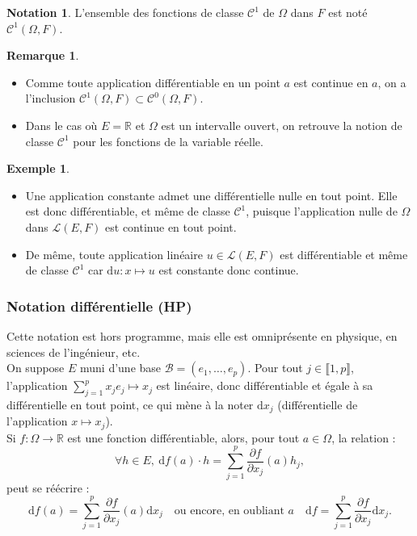 \documentclass[french]{article}
\newcommand{\R}{\mathbb{R}}
\renewcommand{\d}{\text{d}}
\theoremstyle{plain}
\theoremstyle{definition}
\newtheorem*{ex}{Exemple}
\newtheorem*{rmq}{Remarque}
\newtheorem*{notation}{Notation}
\theoremstyle{remark}
\begin{document}
\begin{notation}
	L'ensemble des fonctions de classe $\mathcal{C}^1$ de $\Omega$ dans $F$ est noté $\mathcal{C}^1(\Omega, F)$. 
\end{notation}

\begin{rmq}
	\begin{itemize}
		\item Comme toute application différentiable en un point $a$ est continue en $a$, on a l'inclusion $\mathcal{C}^1(\Omega,F)\subset\mathcal{C}^0(\Omega,F)$.
		\item Dans le cas où $E=\R$ et $\Omega$ est un intervalle ouvert, on retrouve la notion de classe $\mathcal{C}^1$ pour les fonctions de la variable réelle.
	\end{itemize}
\end{rmq}

\begin{ex}
	\begin{itemize}
		\item Une application constante admet une différentielle nulle en tout point. Elle est donc différentiable, et même de classe $\mathcal{C}^1$, puisque l'application nulle de $\Omega$ dans $\mathcal{L}(E,F)$ est continue en tout point.
		\item De même, toute application linéaire $u\in\mathcal{L}(E,F)$ est différentiable et même de classe $\mathcal{C}^1$ car $\d u:x\mapsto u$ est constante donc continue.
	\end{itemize}
\end{ex}

\subsubsection*{Notation différentielle (HP)}

Cette notation est hors programme, mais elle est omniprésente en physique, en sciences de l'ingénieur, etc.\\
On suppose $E$ muni d'une base $\mathcal{B}=(e_1,\ldots,e_p)$. Pour tout $j\in\llbracket1,p\rrbracket$, l'application $\displaystyle\sum_{j=1}^{p}x_je_j\mapsto x_j$ est linéaire, donc différentiable et égale à sa différentielle en tout point, ce qui mène à la noter $\d x_j$ (différentielle de l'application $x\mapsto x_j$).\\
Si $f:\Omega\to\R$ est une fonction différentiable, alors, pour tout $a\in\Omega$, la relation :
$$\forall h\in E,\ \d f(a)\cdot h=\sum_{j=1}^{p}\frac{\partial f}{\partial x_j}(a)h_j,$$ peut se réécrire :
$$\d f(a)=\sum_{j=1}^{p}\frac{\partial f}{\partial x_j}(a)\d x_j\quad\text{ou encore, en oubliant }a\quad \d f=\sum_{j=1}^{p}\frac{\partial f}{\partial x_j}\d x_j.$$
\end{document}
